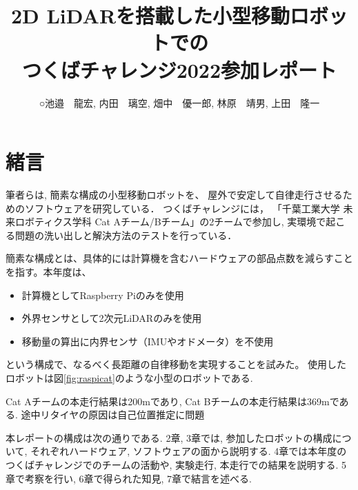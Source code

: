 \documentclass[twocolumn,9pt]{jsproceedings}
\title{2D LiDARを搭載した小型移動ロボットでの\\つくばチャレンジ2022参加レポート}
\author{○池邉　龍宏\authorrefmark{1}, 内田　璃空\authorrefmark{1}, 畑中　優一郎\authorrefmark{1}, 林原　靖男\authorrefmark{1}, 上田　隆一\authorrefmark{1}}
\affiliation{千葉工業大学 未来ロボティクス学科 Cat Aチーム}
\begin{document}
\maketitle



\section{緒言}

筆者らは, 簡素な構成の小型移動ロボットを、
屋外で安定して自律走行させるためのソフトウェアを研究している．
つくばチャレンジには，
「千葉工業大学 未来ロボティクス学科 Cat Aチーム/Bチーム」の2チームで参加し, 
実環境で起こる問題の洗い出しと解決方法のテストを行っている．


簡素な構成とは、具体的には計算機を含むハードウェアの部品点数を減らすことを指す。本年度は、
\begin{itemize}
\item 計算機としてRaspberry Piのみを使用
\item 外界センサとして2次元LiDARのみを使用
\item 移動量の算出に内界センサ（IMUやオドメータ）を不使用
\end{itemize}
という構成で、なるべく長距離の自律移動を実現することを試みた。
使用したロボットは図\ref{fig:raspicat}のような小型のロボットである. 

Cat Aチームの本走行結果は200mであり, 
Cat Bチームの本走行結果は369mである. 
途中リタイヤの原因は自己位置推定に問題





本レポートの構成は次の通りである. 
2章, 3章では, 参加したロボットの構成について, 
それぞれハードウェア, ソフトウェアの面から説明する. 
4章では本年度のつくばチャレンジでのチームの活動や, 
実験走行, 本走行での結果を説明する.
5章で考察を行い, 6章で得られた知見, 7章で結言を述べる. 
\end{document}
